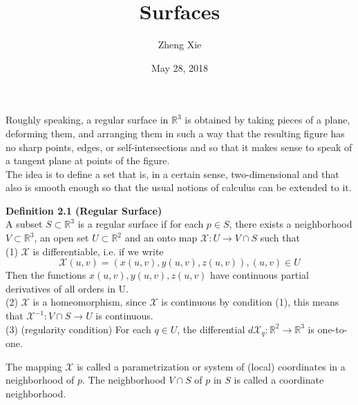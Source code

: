 \documentclass{article}
\author{Zheng Xie}
\title{Surfaces}
\date{May 28, 2018}
\begin{document}
\maketitle
    
\setlength\parindent{0em}   %
\setlength\parskip{1.0\baselineskip} %

\par
Roughly speaking, a regular surface in $\mathbb{R}^3$ is obtained by taking pieces of a plane,
deforming them, and arranging them in such a way that the resulting figure has no sharp points, edges, or self-intersections
and so that it makes sense to speak of a tangent plane at points of the figure.\\
The idea is to define a set that is, in a certain sense, two-dimensional and that also is smooth
enough so that the usual notions of calculus can be extended to it.
    
\par
\textbf{Definition 2.1 (Regular Surface)}\\
A subset $S \subset \mathbb R^3$ is a regular surface if for each $p \in S$, there exists a neighborhood
$V \subset \mathbb R^3$, an open set $U \subset \mathbb R^2$ and an onto map $\mathcal{X}:U \to V \cap S$ such that\\
(1) $\mathcal{X}$ is differentiable, i.e. if we write\\
$$
    \mathcal{X}(u,v) = (x(u,v), y(u,v), z(u,v)), (u,v) \in U
$$
Then the functions $x(u,v), y(u,v), z(u,v)$ have continuous partial derivatives of all orders in U.\\
(2) $\mathcal{X}$ is a homeomorphism, since $\mathcal{X}$ is continuous by condition (1), this means that 
$\mathcal{X}^{-1}: V \cap S \to U$ is continuous.\\
(3) (regularity condition) For each $q \in U$, the differential $d\mathcal{X}_q: \mathbb{R}^2 \to \mathbb{R}^3$
is one-to-one.

\par
The mapping $\mathcal{X}$ is called a parametrization or system of (local) coordinates
in a neighborhood of $p$. The neighborhood $V \cap S$ of $p$ in $S$ is called a coordinate neighborhood.
\end{document}
